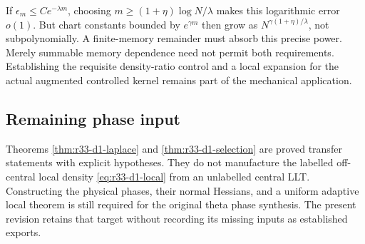 If $\epsilon_m\le Ce^{-\lambda m}$, choosing
$m\ge(1+\eta)\log N/\lambda$ makes this logarithmic error $o(1)$.
But chart constants bounded by $e^{\gamma m}$ then grow as
$N^{\gamma(1+\eta)/\lambda}$, not subpolynomially.  A finite-memory remainder
must absorb this precise power.  Merely summable memory dependence need not
permit both requirements.  Establishing the requisite density-ratio control
and a local expansion for the actual augmented controlled kernel remains
part of the mechanical application.

\subsection{Remaining phase input}

Theorems \ref{thm:r33-d1-laplace} and \ref{thm:r33-d1-selection} are proved
transfer statements with explicit hypotheses.  They do not manufacture the
labelled off-central local density \eqref{eq:r33-d1-local} from an unlabelled
central LLT.  Constructing the physical phases, their normal Hessians, and a
uniform adaptive local theorem is still required for the original theta
phase synthesis.  The present revision retains that target without recording
its missing inputs as established exports.
